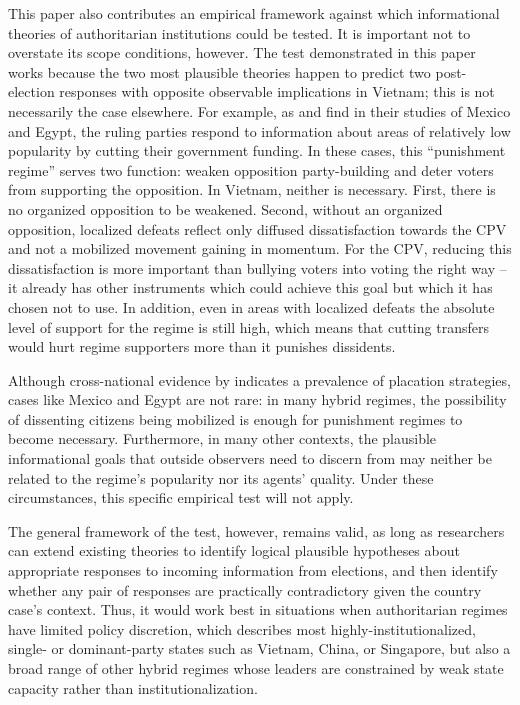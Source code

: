 \documentclass[12pt]{article}
\newcommand{\1}{\mathbbm{1}}
\begin{document}
This paper also contributes an empirical framework against which informational theories of authoritarian institutions could be tested. It is important not to overstate its scope conditions, however. The test demonstrated in this paper works because the two most plausible theories happen to predict two post-election responses with opposite observable implications in Vietnam; this is not necessarily the case elsewhere.  For example, as \citet{Magaloni2006} and \citet{Blaydes2010} find in their studies of Mexico and Egypt, the ruling parties respond to information about areas of relatively low popularity by cutting their government funding. In these cases, this ``punishment regime'' serves two function: weaken opposition party-building and deter voters from supporting the opposition. In Vietnam, neither is necessary. First, there is no organized opposition to be weakened. Second, without an organized opposition, localized defeats reflect only diffused dissatisfaction towards the CPV and not a mobilized movement gaining in momentum. For the CPV, reducing this dissatisfaction is more important than bullying voters into voting the right way -- it already has other instruments which could achieve this goal but which it has chosen not to use. In addition, even in areas with localized defeats the absolute level of support for the regime is still high, which means that cutting transfers would hurt regime supporters more than it punishes dissidents. 

Although cross-national evidence by \citet{Miller2015} indicates a prevalence of placation strategies, cases like Mexico and Egypt are not rare: in many hybrid regimes, the possibility of dissenting citizens being mobilized is enough for punishment regimes to become necessary. Furthermore, in many other contexts, the plausible informational goals that outside observers need to discern from may neither be related to the regime's popularity nor its agents' quality. Under these circumstances, this specific empirical test will not apply. 

The general framework of the test, however, remains valid, as long as researchers can extend existing theories to identify logical plausible hypotheses about appropriate responses to incoming information from elections, and then identify whether any pair of responses are practically contradictory given the country case's context. Thus, it would work best in situations when authoritarian regimes have limited policy discretion, which describes most highly-institutionalized, single- or dominant-party states such as Vietnam, China, or Singapore, but also a broad range of other hybrid regimes whose leaders are constrained by weak state capacity rather than institutionalization.

\printbibliography[heading=bibintoc]
\end{document}
